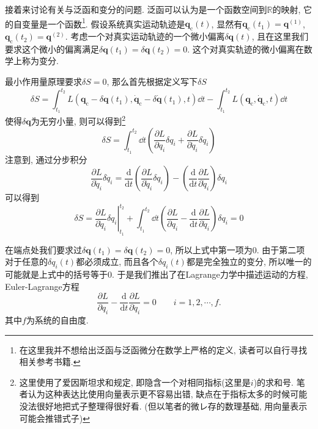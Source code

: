         接着来讨论有关与泛函和变分的问题. 泛函可以认为是一个函数空间到$\mathbb{R}$的映射, 它的自变量是一个函数\footnote{在这里我并不想给出泛函与泛函微分在数学上严格的定义, 读者可以自行寻找相关参考书籍.}. 假设系统真实运动轨迹是$\bm q_\mathrm{c}(t)$, 显然有$\bm q_\mathrm{c}(t_1) = \bm q^{(1)}$, $\bm q_\mathrm{c}(t_2) =\bm q^{(2)}$. 考虑一个对真实运动轨迹的一个微小偏离$\delta \bm q(t)$, 且在这里我们要求这个微小的偏离满足$\delta \bm q(t_1)=\delta \bm q(t_2)=0$. 这个对真实轨迹的微小偏离在数学上称为变分.

        最小作用量原理要求$\delta S = 0$, 那么首先根据定义写下$\delta S$
        \begin{equation}
            \delta S = \int_{t_1}^{t_2} L( \bm q_\mathrm{c} - \delta \bm q(t_1) , \dot{\bm q}_\mathrm{c} - \delta \dot{\bm q}(t_1), t ) \dd t - \int_{t_1}^{t_2} L( \bm q_\mathrm{c} , \dot{\bm q}_\mathrm{c}, t ) \dd t
        \end{equation}
        使得$\delta \bm q$为无穷小量, 则可以得到\footnote{这里使用了爱因斯坦求和规定, 即隐含一个对相同指标(这里是$i$)的求和号. 笔者认为这种表达比使用向量表示更不容易出错, 缺点在于指标太多的时候可能没法很好地把式子整理得很好看. (但以笔者的微レ存的数理基础, 用向量表示可能会推错式子)}
        \begin{equation}
            \delta S = \int_{t_1}^{t_2} \dd t \left( \frac{\partial L}{\partial q_i} \delta q_i + \frac{\partial L}{\partial \dot q_i} \delta \dot q_i \right)
        \end{equation}
        注意到, 通过分步积分
        \begin{equation}
            \frac{\partial L}{\partial \dot q_i} \delta \dot q_i = \frac{\mathrm{d}}{\mathrm{d} t} \left( \frac{\partial L}{\partial \dot q_i} \delta q_i \right) - \left(\frac{\mathrm{d} }{\mathrm{d} t} \frac{\partial L}{\partial \dot q_i} \right) \delta q_i
        \end{equation}
        可以得到
        \begin{equation}\label{eq:8-1-1}
            \delta S = \left. \frac{\partial L}{\partial \dot q_i} \delta q_i \right|_{t_1}^{t_2} + \int_{t_1}^{t_2} \dd t \left( \frac{\partial L}{\partial q_i} - \frac{\mathrm{d} }{\mathrm{d} t} \frac{\partial L}{\partial \dot q_i} \right) \delta q_i = 0
        \end{equation}

        在端点处我们要求过$\delta \bm q(t_1)=\delta \bm q(t_2)=0$, 所以上式中第一项为0. 由于第二项对于任意的$\delta q_i(t)$都必须成立, 而且各个$\delta q_i(t)$都是完全独立的变分, 所以唯一的可能就是上式中的括号等于0. 于是我们推出了在Lagrange力学中描述运动的方程, Euler-Lagrange方程
        \begin{equation}
            \frac{\partial L}{\partial q_i} - \frac{\mathrm{d} }{\mathrm{d} t} \frac{\partial L}{\partial \dot q_i} = 0
            \qquad i = 1,2,\cdots,f.
        \end{equation}
        其中$f$为系统的自由度. 

